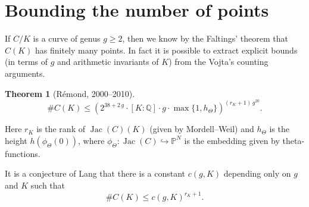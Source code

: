 \documentclass{article}
\newtheorem{theorem}[proposition]{Theorem}
\theoremstyle{definition}
\DeclareMathOperator{\Hom}{Hom}
\DeclareMathOperator{\Gal}{Gal}
\DeclareMathOperator{\Jac}{Jac}
\newcommand{\isom}{\simeq}
\newcommand{\term}{\textbf}
\newcommand{\dfn}{\mathrel{\mathop:}=}
\newcommand{\ZZ}{\mathbb{Z}}
\newcommand{\QQ}{\mathbb{Q}}
\newcommand{\PP}{\mathbb{P}}
\renewcommand{\mod}{\mathop{\,\mathrm{mod}\,}}
\begin{document}








\section{Bounding the number of points}

If $C/K$ is a curve of genus $g \ge 2$, then we know by the Faltings' theorem
that $C (K)$ has finitely many points. In fact it is possible to extract
explicit bounds (in terms of $g$ and arithmetic invariants of $K$) from the
Vojta's counting arguments.

\begin{theorem}[R\'emond, 2000--2010]
  $$\# C (K) \le \left(2^{38+2\,g} \cdot [K : \QQ] \cdot g \cdot \max \{ 1, h_\Theta \}\right)^{(r_K + 1)\,g^{20}}.$$
\end{theorem}

Here $r_K$ is the rank of $\Jac (C) (K)$ (given by Mordell--Weil) and $h_\Theta$
is the height $h (\phi_\Theta (0))$, where
$\phi_\Theta\colon \Jac (C) \hookrightarrow \PP^N$ is the embedding given by
theta-functions.

It is a conjecture of Lang that there is a constant $c (g,K)$ depending only on
$g$ and $K$ such that
$$\# C (K) \le c (g,K)^{r_K + 1}.$$
\end{document}
